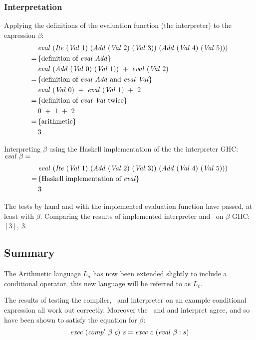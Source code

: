 \documentclass {article}
\begin{document}
\subsubsection{Interpretation}

Applying the definitions of the evaluation function (the interpreter) to the expression $\beta$:
\begin{align*}
	&\evalf  (\Ite (\Val 1)\ 
	(\Add (\Val 2)\ (\Val 3))\ (\Add (\Val 4)\ (\Val 5))) \\
	=\, & \{ \mbox{definition of \eval\ \add} \} \\
	&\evalf  (\Add (\Val 0)\ (\Val 1))\ +\ \evalf  (\Val 2) \\
	=\, & \{ \mbox{definition of \eval\ \add\ and \eval\ \val} \} \\
	&\evalf  (\Val 0)\ +\ \evalf  (\Val 1)\ +\ 2 \\
	=\, & \{ \mbox{definition of \eval\ \val\ twice} \} \\
	&0\ +\ 1\ +\ 2 \\
	=\, & \{ \mbox{arithmetic} \} \\
	&3
\end{align*}

Interpreting $\beta$ 
using the Haskell implementation of the the interpreter
GHC: \( \mathit{eval\ } \beta = \)
\begin{align*}
&\evalf (\Ite (\Val 1)\ 
	(\Add (\Val 2)\ (\Val 3))\ (\Add (\Val 4)\ (\Val 5))) \\
=\, & \{ \mbox{Haskell implementation of \eval} \} \\
&3
\end{align*}

The tests by hand and with the implemented evaluation function
have passed, at least with $\beta$.
Comparing the results of  
implemented interpreter and \vm\ on $\beta$
GHC: \( [3],\ 3 \).

\subsection{Summary}

The Arithmetic language $L_a$ has now been extended slightly
to include a conditional operator, this new language will be
referred to as $L_c$.

The results of testing the compiler, \vm\ and interpreter on 
an example conditional expression all work out correctly.
Moreover the \vm\ and and interpret agree, and so
have been shown to satisfy the equation for $\beta$:
\[ \Exec (\Compp \beta\ c)\ s = \Exec c\ (\evalf \beta : s) \]
\end{document}
